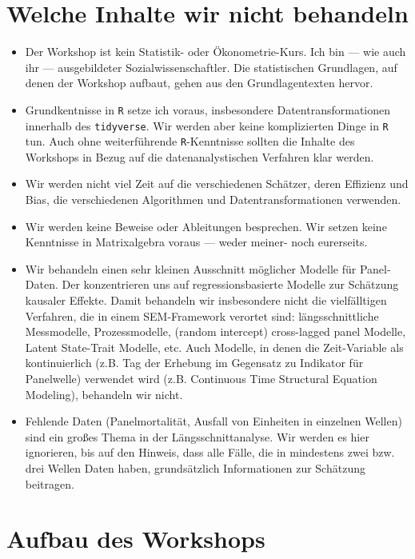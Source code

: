 \documentclass[]{book}
\begin{document}
\hypertarget{welche-inhalte-wir-nicht-behandeln}{%
\section{Welche Inhalte wir nicht behandeln}\label{welche-inhalte-wir-nicht-behandeln}}

\begin{itemize}
\item
  Der Workshop ist kein Statistik- oder Ökonometrie-Kurs. Ich bin --- wie auch ihr --- ausgebildeter Sozialwissenschaftler. Die statistischen Grundlagen, auf denen der Workshop aufbaut, gehen aus den Grundlagentexten \citep{bellExplainingFixedEffects2015, vaiseyWhatYouCan2017} hervor.
\item
  Grundkentnisse in \texttt{R} setze ich voraus, insbesondere Datentransformationen innerhalb des \texttt{tidyverse}. Wir werden aber keine komplizierten Dinge in \texttt{R} tun. Auch ohne weiterführende \texttt{R}-Kenntnisse sollten die Inhalte des Workshops in Bezug auf die datenanalystischen Verfahren klar werden.
\item
  Wir werden nicht viel Zeit auf die verschiedenen Schätzer, deren Effizienz und Bias, die verschiedenen Algorithmen und Datentransformationen verwenden.
\item
  Wir werden keine Beweise oder Ableitungen besprechen. Wir setzen keine Kenntnisse in Matrixalgebra voraus --- weder meiner- noch eurerseits.
\item
  Wir behandeln einen sehr kleinen Ausschnitt möglicher Modelle für Panel-Daten. Der konzentrieren uns auf regressionsbasierte Modelle zur Schätzung kausaler Effekte. Damit behandeln wir insbesondere nicht die vielfälltigen Verfahren, die in einem SEM-Framework verortet sind: längsschnittliche Messmodelle, Prozessmodelle, (random intercept) cross-lagged panel Modelle, Latent State-Trait Modelle, etc. Auch Modelle, in denen die Zeit-Variable als kontinuierlich (z.B. Tag der Erhebung im Gegensatz zu Indikator für Panelwelle) verwendet wird (z.B. Continuous Time Structural Equation Modeling), behandeln wir nicht.
\item
  Fehlende Daten (Panelmortalität, Ausfall von Einheiten in einzelnen Wellen) sind ein großes Thema in der Längsschnittanalyse. Wir werden es hier ignorieren, bis auf den Hinweis, dass alle Fälle, die in mindestens zwei bzw. drei Wellen Daten haben, grundsätzlich Informationen zur Schätzung beitragen.
\end{itemize}

\hypertarget{aufbau-des-workshops}{%
\section{Aufbau des Workshops}\label{aufbau-des-workshops}}
\end{document}
